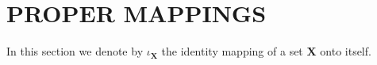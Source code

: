\section{PROPER MAPPINGS}

In this section we denote by \(\iota_{\mathbf{X}}\) the identity mapping of a set \(\mathbf{X}\) onto itself.

